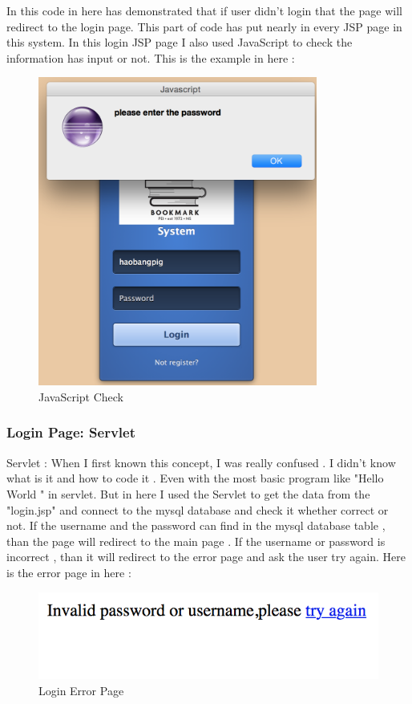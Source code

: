 \documentclass[12pt]{article}
\begin{document}
	In this code  in  here has demonstrated  that if user didn't login that the page will redirect to the login page. This part of code has put nearly in every JSP page in this system.
	In this login JSP page I also used JavaScript to check the information has input or not. This is the example in here :
\begin{figure}[H]
	\centering
		
		\includegraphics[height=4in]{images/JavaScriptCheckImage.jpg}

	\caption[JavaScript Check Image]{JavaScript Check}
	\label{fig:JavaScript Login}
\end{figure}
	
	
\cleardoublepage	

\subsubsection{Login Page: Servlet}
Servlet : When I first known this concept,  I was really confused . I didn't know what is it and how to code it . Even with the most basic program like "Hello World " in servlet. But in here I used the Servlet to get the data from the "login.jsp" and connect to the mysql database and check  it whether correct or not.  
	If the username and the password can find in the mysql database table , than the page will redirect to the main page . If the username or password is incorrect , than  it will redirect to the error page and ask the user try again. 
	 Here is the error page in here :
	\begin{figure}[H]
	\centering
		\includegraphics[width=15cm]{images/loginError.jpg}
		\caption[Login Error]{Login Error Page}
	\label{fig:loginErrorPage}
\end{figure}
\end{document}
